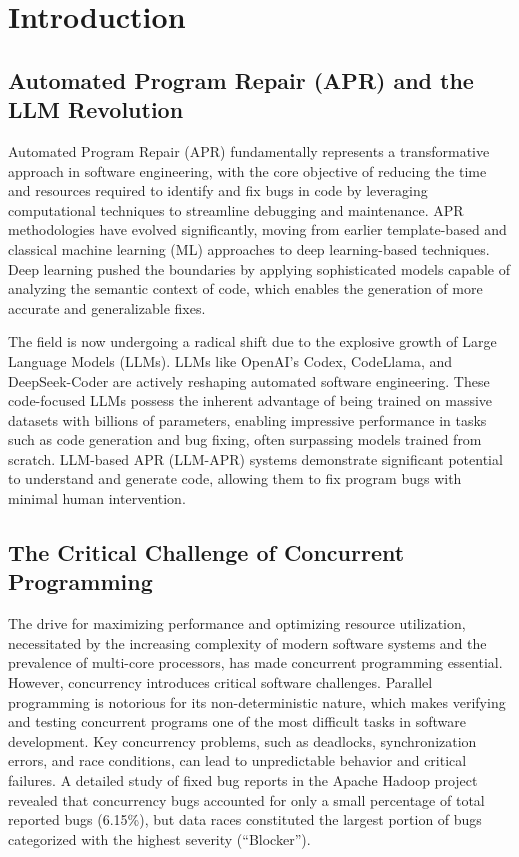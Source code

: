 \section{Introduction}

\subsection{Automated Program Repair (APR) and the LLM Revolution}

Automated Program Repair (APR) fundamentally represents a transformative approach in software engineering, with the core objective of reducing the time and resources required to identify and fix bugs in code by leveraging computational techniques to streamline debugging and maintenance. APR methodologies have evolved significantly, moving from earlier template-based and classical machine learning (ML) approaches to deep learning-based techniques. Deep learning pushed the boundaries by applying sophisticated models capable of analyzing the semantic context of code, which enables the generation of more accurate and generalizable fixes.

The field is now undergoing a radical shift due to the explosive growth of Large Language Models (LLMs). LLMs like OpenAI’s Codex, CodeLlama, and DeepSeek-Coder are actively reshaping automated software engineering. These code-focused LLMs possess the inherent advantage of being trained on massive datasets with billions of parameters, enabling impressive performance in tasks such as code generation and bug fixing, often surpassing models trained from scratch. LLM-based APR (LLM-APR) systems demonstrate significant potential to understand and generate code, allowing them to fix program bugs with minimal human intervention.

\subsection{The Critical Challenge of Concurrent Programming}

The drive for maximizing performance and optimizing resource utilization, necessitated by the increasing complexity of modern software systems and the prevalence of multi-core processors, has made concurrent programming essential. However, concurrency introduces critical software challenges. Parallel programming is notorious for its non-deterministic nature, which makes verifying and testing concurrent programs one of the most difficult tasks in software development. Key concurrency problems, such as deadlocks, synchronization errors, and race conditions, can lead to unpredictable behavior and critical failures. A detailed study of fixed bug reports in the Apache Hadoop project revealed that concurrency bugs accounted for only a small percentage of total reported bugs (6.15\%), but data races constituted the largest portion of bugs categorized with the highest severity (“Blocker”).

